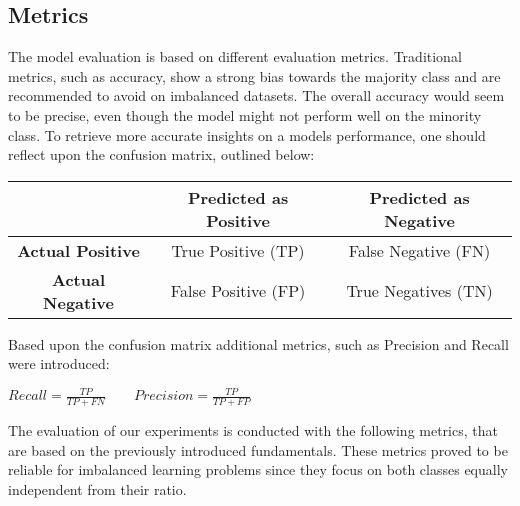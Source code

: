 \documentclass[parskip=full]{scrartcl}
\begin{document}
\subsection{Metrics}

The model evaluation is based on different evaluation metrics. Traditional metrics, such as accuracy, 
show a strong bias towards the majority class and are recommended to avoid on imbalanced datasets. The 
overall accuracy would seem to be precise, even though the model might not perform well on the minority 
class. To retrieve more accurate insights on a models performance, one should reflect upon the confusion 
matrix, outlined below: 

\begin{center}
\begin{tabular}{ c|c|c }
  & \textbf{Predicted as Positive} & \textbf{Predicted as Negative} \\  [1ex] 
  \hline
 \textbf{Actual Positive} & True Positive (TP) & False Negative (FN) \\  [1ex] 
 \textbf{Actual Negative} & False Positive (FP) & True Negatives (TN) \\ [1ex] 
\end{tabular}
\end{center}

Based upon the confusion matrix additional metrics, such as Precision and Recall \cite{Dalianis2018} were introduced: 

\begin{center} $ Recall = \frac{TP}{TP + FN} \qquad Precision =  \frac{TP}{TP + FP}$\end{center}

The evaluation of our experiments is conducted with the following metrics, that are based on the previously 
introduced fundamentals. These metrics proved to be reliable for imbalanced learning problems since they 
focus on both classes equally independent from their ratio.
\end{document}
